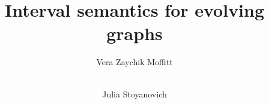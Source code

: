 \documentclass{style/sig-alternate}
\begin{document}
\title{Interval semantics for evolving graphs}

\author{
  \alignauthor Vera Zaychik Moffitt\\
  \\
    \and
%
  \alignauthor Julia Stoyanovich\\
  \\
    \\
}


\maketitle

\thispagestyle{empty}










\end{document}
